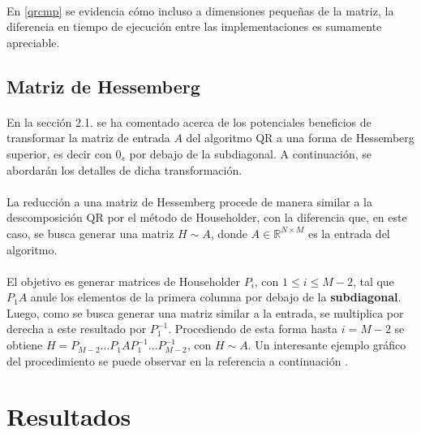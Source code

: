 \documentclass[12pt, twocolumn]{article}
\begin{document}
	\paragraph{} En \ref{qrcmp} se evidencia cómo incluso a dimensiones pequeñas de la matriz, la diferencia en tiempo de ejecución entre las implementaciones es sumamente apreciable.
	
	\subsection{Matriz de Hessemberg}
	
	\paragraph{} En la sección 2.1. se ha comentado acerca de los potenciales beneficios de transformar la matriz de entrada $A$ del algoritmo QR a una forma de Hessemberg superior, es decir con $0_{s}$ por debajo de la subdiagonal. A continuación, se abordarán los detalles de dicha transformación.
	
	\paragraph{} La reducción a una matriz de Hessemberg procede de manera similar a la descomposición QR por el método de Householder, con la diferencia que, en este caso, se busca generar una matriz $H \sim A$, donde $A \in \mathbb{R}^{N\times M}$ es la entrada del algoritmo. 
	
	\paragraph{} El objetivo es generar matrices de Householder $P_{i}$, con $ 1\le i \le M-2$, tal que $P_{1}A$ anule los elementos de la primera columna por debajo de la \textbf{subdiagonal}. Luego, como se busca generar una matriz similar a la entrada, se multiplica por derecha a este resultado por $P_{1}^{-1}$. Procediendo de esta forma hasta $i = M-2$ se obtiene $H = P_{M-2}\dots P_{1}AP_{1}^{-1}\dots P_{M-2}^{-1}$, con $H \sim A$. Un interesante ejemplo gráfico del procedimiento se puede observar en la referencia a continuación \cite{hess}. 
	

	
	\section{Resultados}
	
\end{document}
